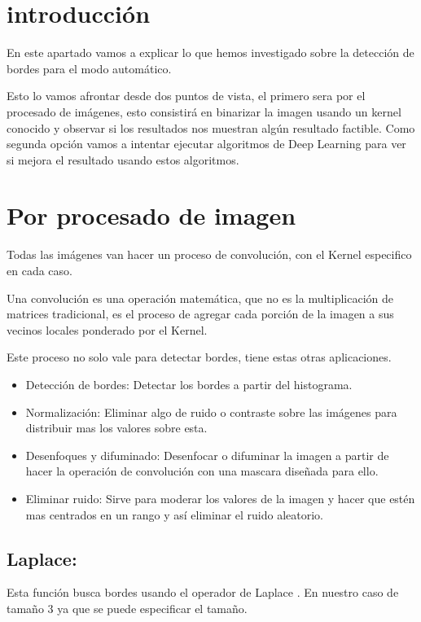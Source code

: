 
\section{introducción}
En este apartado vamos a explicar lo que hemos investigado sobre la detección de bordes para el modo automático.

Esto lo vamos afrontar desde dos puntos de vista, el primero sera por el procesado de imágenes, esto consistirá en binarizar la imagen usando un kernel conocido y observar si los resultados nos muestran algún resultado factible.
Como segunda opción vamos a intentar ejecutar algoritmos de Deep Learning para ver si mejora el resultado usando estos algoritmos.

\section{Por procesado de imagen}
Todas las imágenes van hacer un proceso de convolución, con el Kernel \cite{wiki:kernels} especifico en cada caso.

Una convolución es una operación matemática, que no es la multiplicación de matrices tradicional, es el proceso de agregar cada porción de la imagen a sus vecinos locales ponderado por el Kernel. 

Este proceso no solo vale para detectar bordes, tiene estas otras aplicaciones.
\begin{itemize}
\item Detección de bordes: Detectar los bordes a partir del histograma.
\item Normalización: Eliminar algo de ruido o contraste sobre las imágenes para distribuir mas los valores sobre esta.
\item Desenfoques y difuminado: Desenfocar o difuminar la imagen a partir de hacer la operación de convolución con una mascara diseñada para ello.
\item Eliminar ruido: Sirve para moderar los valores de la imagen  y hacer que estén mas centrados en un rango y así eliminar el ruido aleatorio. 
\end{itemize}

\subsection{Laplace:}
Esta función busca bordes usando el operador de Laplace \cite{wiki:Laplace}. En nuestro caso de tamaño 3 ya que se puede especificar el tamaño.

